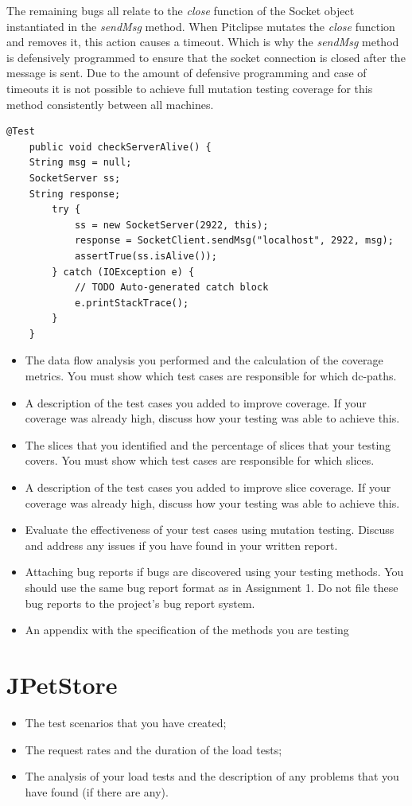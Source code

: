 \documentclass[fontsize=12pt,paper=letter,twoside]{scrartcl}
\begin{document}
The remaining bugs all relate to the \emph{close} function of the Socket object instantiated in the \emph{sendMsg} method. When Pitclipse mutates the \emph{close} function and removes it, this action causes a timeout. Which is why the \emph{sendMsg} method is defensively programmed to ensure that the socket connection is closed after the message is sent. Due to the amount of defensive programming and case of timeouts it is not possible to achieve full mutation testing coverage for this method consistently between all machines.

\begin{lstlisting}[caption={Additional test case for sendMsg},label={list:sendMsg}]
    @Test
    public void checkServerAlive() {
    String msg = null;
    SocketServer ss;
    String response;
        try {
            ss = new SocketServer(2922, this);
            response = SocketClient.sendMsg("localhost", 2922, msg);
            assertTrue(ss.isAlive());
        } catch (IOException e) {
            // TODO Auto-generated catch block
            e.printStackTrace();
        }
    }
\end{lstlisting}

\begin{itemize}
\item The data flow analysis you performed and the calculation of the coverage metrics. You must
show which test cases are responsible for which dc-paths.
\item A description of the test cases you added to improve coverage. If your coverage was already high,
discuss how your testing was able to achieve this.
\item The slices that you identified and the percentage of slices that your testing covers. You must
show which test cases are responsible for which slices.
\item A description of the test cases you added to improve slice coverage. If your coverage was
already high, discuss how your testing was able to achieve this.
\item Evaluate the effectiveness of your test cases using mutation testing. Discuss and address any
issues if you have found in your written report.
\item Attaching bug reports if bugs are discovered using your testing methods. You should use the
same bug report format as in Assignment 1. Do not file these bug reports to the project’s bug
report system.
\item An appendix with the specification of the methods you are testing
\end{itemize}

\section{JPetStore}

\begin{itemize}
\item The test scenarios that you have created;
\item The request rates and the duration of the load tests;
\item The analysis of your load tests and the description of any problems that you have found (if there
are any).
\end{itemize}
\end{document}
